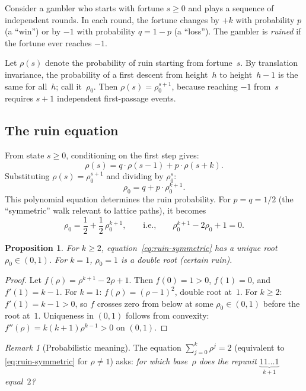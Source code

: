 \documentclass[11pt]{article}
\newtheorem{proposition}[theorem]{Proposition}
\theoremstyle{definition}
\theoremstyle{remark}
\newtheorem{remark}[theorem]{Remark}
\begin{document}
Consider a gambler who starts with fortune $s \geq 0$ and plays a
sequence of independent rounds.
In each round, the fortune changes by $+k$ with probability $p$
(a ``win'') or by $-1$ with probability $q = 1 - p$ (a ``loss'').
The gambler is \emph{ruined} if the fortune ever reaches $-1$.

Let $\rho(s)$ denote the probability of ruin starting from fortune~$s$.
By translation invariance, the probability of a first descent from
height~$h$ to height~$h - 1$ is the same for all~$h$; call it~$\rho_0$.
Then $\rho(s) = \rho_0^{s+1}$, because reaching $-1$ from~$s$ requires
$s + 1$ independent first-passage events.

\subsection{The ruin equation}

From state $s \geq 0$, conditioning on the first step gives:
\[
\rho(s) = q \cdot \rho(s - 1) + p \cdot \rho(s + k).
\]
Substituting $\rho(s) = \rho_0^{s+1}$ and dividing by $\rho_0^s$:
\begin{equation}\label{eq:ruin-eq}
\rho_0 = q + p \cdot \rho_0^{k+1}.
\end{equation}
This polynomial equation determines the ruin probability.
For $p = q = 1/2$ (the ``symmetric'' walk relevant to lattice paths), it becomes
\begin{equation}\label{eq:ruin-symmetric}
\rho_0 = \frac{1}{2} + \frac{1}{2}\,\rho_0^{k+1},
\qquad\text{i.e.,}\qquad
\rho_0^{k+1} - 2\rho_0 + 1 = 0.
\end{equation}

\begin{proposition}\label{prop:ruin-root}
For $k \geq 2$, equation~\eqref{eq:ruin-symmetric} has a unique root
$\rho_0 \in (0, 1)$.
For $k = 1$, $\rho_0 = 1$ is a double root (certain ruin).
\end{proposition}

\begin{proof}
Let $f(\rho) = \rho^{k+1} - 2\rho + 1$.
Then $f(0) = 1 > 0$, $f(1) = 0$, and $f'(1) = k - 1$.
For $k = 1$: $f(\rho) = (\rho - 1)^2$, double root at~$1$.
For $k \geq 2$: $f'(1) = k - 1 > 0$, so $f$ crosses zero from
below at some $\rho_0 \in (0, 1)$ before the root at~$1$.
Uniqueness in $(0, 1)$ follows from convexity:
$f''(\rho) = k(k+1)\rho^{k-1} > 0$ on $(0, 1)$.
\end{proof}

\begin{remark}[Probabilistic meaning]
The equation $\sum_{j=0}^{k} \rho^j = 2$ (equivalent to
\eqref{eq:ruin-symmetric} for $\rho \neq 1$) asks:
\emph{for which base~$\rho$ does the repunit $\underbrace{11\ldots1}_{k+1}$
equal~$2$?}
\end{remark}
\end{document}
